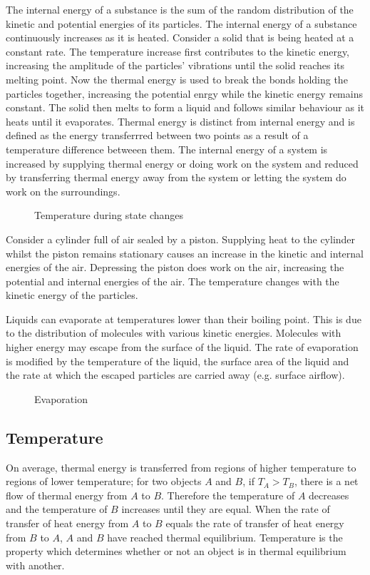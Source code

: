 \documentclass[a4,8pt]{article}
\begin{document}
The internal energy of a substance is the sum of the random distribution of the kinetic and potential energies of its particles. The internal energy of a substance continuously increases as it is heated. Consider a solid that is being heated at a constant rate. The temperature increase first contributes to the kinetic energy, increasing the amplitude of the particles' vibrations until the solid reaches its melting point. Now the thermal energy is used to break the bonds holding the particles together, increasing the potential enrgy while the kinetic energy remains constant. The solid then melts to form a liquid and follows similar behaviour as it heats until it evaporates. Thermal energy is distinct from internal energy and is defined as the energy transferrred between two points as a result of a temperature difference betweeen them. The internal energy of a system is increased by supplying thermal energy or doing work on the system and reduced by transferring thermal energy away from the system or letting the system do work on the surroundings.

\begin{figure}[H]
\begin{tikzpicture}
\end{tikzpicture}
\caption{Temperature during state changes}
\end{figure}

Consider a cylinder full of air sealed by a piston. Supplying heat to the cylinder whilst the piston remains stationary causes an increase in the kinetic and internal energies of the air. Depressing the piston does work on the air, increasing the potential and internal energies of the air. The temperature changes with the kinetic energy of the particles.

Liquids can evaporate at temperatures lower than their boiling point. This is due to the distribution of molecules with various kinetic energies. Molecules with higher energy may escape from the surface of the liquid. The rate of evaporation is modified by the temperature of the liquid, the surface area of the liquid and the rate at which the escaped particles are carried away (e.g. surface airflow).

\begin{figure}[H]
\begin{tikzpicture}
\end{tikzpicture}
\caption{Evaporation}
\end{figure}

\subsection{Temperature}
On average, thermal energy is transferred from regions of higher temperature to regions of lower temperature; for two objects $A$ and $B$, if $T_A>T_B$, there is a net flow of thermal energy from $A$ to $B$. Therefore the temperature of $A$ decreases and the temperature of $B$ increases until they are equal. When the rate of transfer of heat energy from $A$ to $B$ equals the rate of transfer of heat energy from $B$ to $A$, $A$ and $B$ have reached thermal equilibrium. Temperature is the property which determines whether or not an object is in thermal equilibrium with another.
\end{document}
